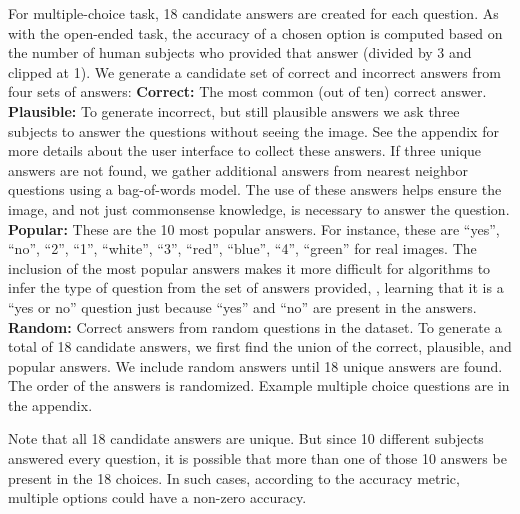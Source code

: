 For multiple-choice task, 18 candidate answers are created for each question. As with the open-ended task,
the accuracy of a chosen option is computed based on the number of human subjects who provided 
that answer (divided by 3 and clipped at 1). We generate a candidate set of correct
and incorrect answers from four sets of answers:
\textbf{Correct:} The most common (out of ten) correct answer.
\textbf{Plausible:} To generate incorrect, but still plausible answers we ask
three subjects to answer the questions without seeing the image. See the appendix for more details about the user interface to collect these answers. If three unique answers
are not found, we gather additional answers from nearest neighbor questions
using a bag-of-words model. The use of these answers helps ensure the image,
and not just commonsense knowledge, is necessary to answer the question.
\textbf{Popular:} These are the 10 most popular answers. For instance, these are ``yes'',
``no'', ``2'', ``1'', ``white'', ``3'', ``red'', ``blue'', ``4'', ``green'' for real images.
The inclusion of the most popular answers makes it more difficult for algorithms to infer the type of
question from the set of answers provided, \ie, learning that it is a ``yes or no'' question just because
``yes'' and ``no'' are present in the answers.
\textbf{Random:} Correct answers from random questions in the dataset.
To generate a total of 18 candidate answers, we first find the union of the correct, plausible, and popular answers. 
We include random answers until 18 unique answers are found.
The order of the answers is randomized. Example multiple choice questions are in the appendix.

Note that all 18 candidate answers are unique. But since 10 different subjects answered every question, it is possible that more than one of those 10 answers be present in the 18 choices. In such cases, according to the accuracy metric, multiple options could have a non-zero accuracy.